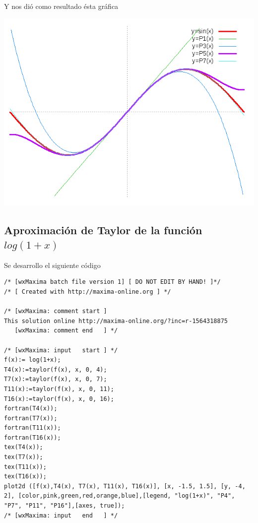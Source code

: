 \documentclass[12pt]{article}
\begin{document}
Y nos dió como resultado ésta gráfica
\begin{center}
\includegraphics[scale=.5]{sin.png}
\end{center}
\pagebreak
\subsection{Aproximación de Taylor de la función $log(1+x)$}
Se desarrollo el siguiente código
\begin{verbatim}
/* [wxMaxima batch file version 1] [ DO NOT EDIT BY HAND! ]*/
/* [ Created with http://maxima-online.org ] */

/* [wxMaxima: comment start ]
This solution online http://maxima-online.org/?inc=r-1564318875
   [wxMaxima: comment end   ] */

/* [wxMaxima: input   start ] */
f(x):= log(1+x);
T4(x):=taylor(f(x), x, 0, 4);
T7(x):=taylor(f(x), x, 0, 7);
T11(x):=taylor(f(x), x, 0, 11);
T16(x):=taylor(f(x), x, 0, 16);
fortran(T4(x));
fortran(T7(x));
fortran(T11(x));
fortran(T16(x));
tex(T4(x));
tex(T7(x));
tex(T11(x));
tex(T16(x));
plot2d ([f(x),T4(x), T7(x), T11(x), T16(x)], [x, -1.5, 1.5], [y, -4, 2], [color,pink,green,red,orange,blue],[legend, "log(1+x)", "P4", "P7", "P11", "P16"],[axes, true]);
/* [wxMaxima: input   end   ] */

\end{verbatim}
\end{document}
